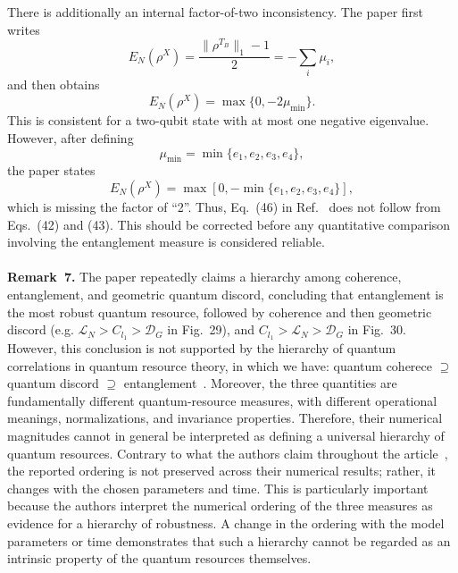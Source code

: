 \documentclass[epjc,twocolumn,nofootinbib,preprintnumbers,amsmath,amssymb]{revtex4-2}
\begin{document}
There is additionally an internal factor-of-two inconsistency. The paper first writes
\begin{equation}
E_N(\rho^X)
=
\frac{\|\rho^{T_B}\|_1-1}{2}
=
-\sum_i\mu_i,
\end{equation}
and then obtains
\begin{equation}
E_N(\rho^X)
=
\max\{0,-2\mu_{\min}\}.
\end{equation}
This is consistent for a two-qubit state with at most one negative eigenvalue.
However, after defining
\begin{equation}
\mu_{\min}=\min\{e_1,e_2,e_3,e_4\},
\end{equation}
the paper states
\begin{equation}
E_N(\rho^X)
=
\max[0,-\min\{e_1,e_2,e_3,e_4\}],
\end{equation}
which is missing the factor of ``2''.
Thus, Eq.~(46) in Ref.~\cite{Bachain} does not follow from Eqs.~(42) and (43).
This should be corrected before any quantitative comparison involving the entanglement measure is considered reliable.
\\
\\
\textbf{Remark~7.}
The paper repeatedly claims a hierarchy among coherence, entanglement, and
geometric quantum discord, concluding that entanglement is the most robust
quantum resource, followed by coherence and then geometric discord (e.g. $\mathcal{L}_N>C_{l_1}>\mathcal{D}_G$ in Fig.~29), and $C_{l_1}>\mathcal{L}_N>\mathcal{D}_G$ in Fig.~30.
However, this conclusion is not supported by the hierarchy of quantum correlations
in quantum resource theory, in which we have: quantum coherece $\supseteq$ quantum discord $\supseteq$ entanglement~\cite{Wiseman2007}.
Moreover, the three quantities are fundamentally different quantum-resource
measures, with different operational meanings, normalizations, and
invariance properties. Therefore, their numerical magnitudes cannot in
general be interpreted as defining a universal hierarchy of quantum
resources. Contrary to what the authors claim throughout the article~\cite{Bachain}, the reported ordering is not preserved across their numerical results; rather, it changes with the chosen parameters and time.
This is particularly important because the authors interpret the numerical
ordering of the three measures as evidence for a hierarchy of robustness.
A change in the ordering with the model parameters or time demonstrates
that such a hierarchy cannot be regarded as an intrinsic property of the
quantum resources themselves.
\\
\end{document}
